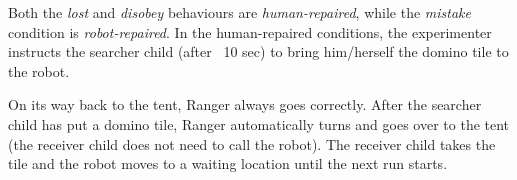 \documentclass[letterpaper, 10pt, conference]{ieeeconf}
\begin{document}
%
%
%
%


Both the \textit{lost} and \emph{disobey} behaviours are
\textit{human-repaired}, while the \emph{mistake} condition is
\emph{robot-repaired}. In the human-repaired conditions, the experimenter
instructs the searcher child (after ~10 sec) to bring him/herself the domino
tile to the robot.

On its way back to the tent, Ranger always goes correctly. After the searcher
child has put a domino tile, Ranger automatically turns and goes over to the
tent (the receiver child does not need to call the robot). The receiver child
takes the tile and the robot moves to a waiting location until the next run
starts.
\end{document}
